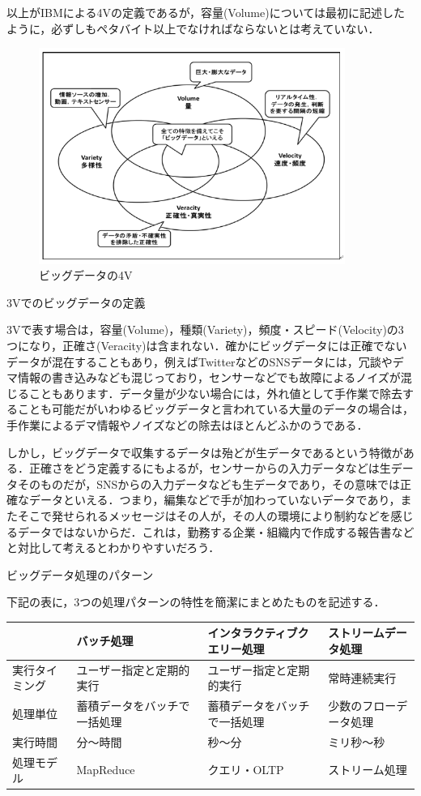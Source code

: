 以上がIBMによる4Vの定義であるが，容量(Volume)については最初に記述したように，必ずしもペタバイト以上でなければならないとは考えていない．


\begin{figure}[H]
\centering
\includegraphics[width=10cm]{bigdata4v.png}
\caption{ビッグデータの4V}\label{サンプル図}
\end{figure}



3Vでのビッグデータの定義

3Vで表す場合は，容量(Volume)，種類(Variety)，頻度・スピード(Velocity)の3つになり，正確さ(Veracity)は含まれない．確かにビッグデータには正確でないデータが混在することもあり，例えばTwitterなどのSNSデータには，冗談やデマ情報の書き込みなども混じっており，センサーなどでも故障によるノイズが混じることもあります．データ量が少ない場合には，外れ値として手作業で除去することも可能だがいわゆるビッグデータと言われている大量のデータの場合は，手作業によるデマ情報やノイズなどの除去はほとんどふかのうである．

しかし，ビッグデータで収集するデータは殆どが生データであるという特徴がある．正確さをどう定義するにもよるが，センサーからの入力データなどは生データそのものだが，SNSからの入力データなども生データであり，その意味では正確なデータといえる．つまり，編集などで手が加わっていないデータであり，またそこで発せられるメッセージはその人が，その人の環境により制約などを感じるデータではないからだ．これは，勤務する企業・組織内で作成する報告書などと対比して考えるとわかりやすいだろう．


ビッグデータ処理のパターン

下記の表に，3つの処理パターンの特性を簡潔にまとめたものを記述する．

\begin{table}[H]
  \begin{tabular}{|l|l|l|l|} \hline
                     & バッチ処理 & インタラクティブクエリー処理 & ストリームデータ処理 \\ \hline
    実行タイミング & ユーザー指定と定期的実行 & ユーザー指定と定期的実行 & 常時連続実行 \\ \hline
    処理単位 & 蓄積データをバッチで一括処理 & 蓄積データをバッチで一括処理 & 少数のフローデータ処理 \\ \hline
    実行時間 & 分～時間 & 秒～分 & ミリ秒～秒 \\ \hline
    処理モデル & MapReduce & クエリ・OLTP & ストリーム処理 \\ \hline
  \end{tabular}
\end{table}



